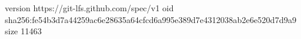 version https://git-lfs.github.com/spec/v1
oid sha256:fe54b3d7a44259ac6e28635a64cfcd6a995e389d7e4312038ab2e6e520d7d9a9
size 11463

